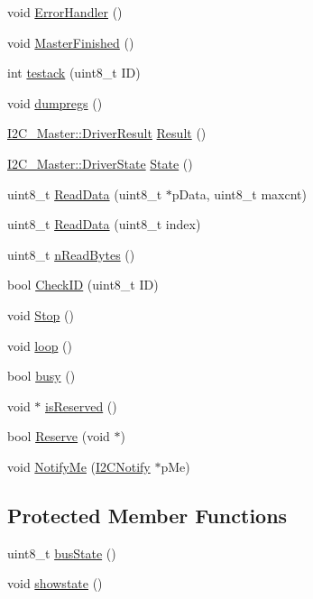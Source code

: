 \begin{DoxyCompactItemize}
\item 
void \hyperlink{class_i2_c___master_a242358ce8f170a38db3624ac55c6510f}{ErrorHandler} ()
\item 
void \hyperlink{class_i2_c___master_aa311bbb226b4c52c52ff87de83d601ee}{MasterFinished} ()
\item 
int \hyperlink{class_i2_c___master_a3dc61a8ad5256ce3aa7219553cbf2f5f}{testack} (uint8\_\-t ID)
\item 
void \hyperlink{class_i2_c___master_a7f45b6d95a4d67b5da5ae81173cf2210}{dumpregs} ()
\item 
\hyperlink{class_i2_c___master_aff65d5186eee9d33563619432439cb53}{I2C\_\-Master::DriverResult} \hyperlink{class_i2_c___master_a24bc6480db778c51e2e1abbacac57a20}{Result} ()
\item 
\hyperlink{class_i2_c___master_aaa6720f57770cfe755cb3d6dfc665cfa}{I2C\_\-Master::DriverState} \hyperlink{class_i2_c___master_a386dc5886d43b456fae8fa0457ad0fa6}{State} ()
\item 
uint8\_\-t \hyperlink{class_i2_c___master_ab7c8dd50c0e931fb20a73e42b2c2202a}{ReadData} (uint8\_\-t $\ast$pData, uint8\_\-t maxcnt)
\item 
uint8\_\-t \hyperlink{class_i2_c___master_a80cb8c3fd55735eea7dbfc90ad7ef5a4}{ReadData} (uint8\_\-t index)
\item 
uint8\_\-t \hyperlink{class_i2_c___master_a62531dd810c1e96ae92657feb6c74bef}{nReadBytes} ()
\item 
bool \hyperlink{class_i2_c___master_a2be70722a626800b0ebeb3cfde946843}{CheckID} (uint8\_\-t ID)
\item 
void \hyperlink{class_i2_c___master_a0e878755be5246de239e897cf60be401}{Stop} ()
\item 
void \hyperlink{class_i2_c___master_af4d34826036a7c9f3ed040d65997f180}{loop} ()
\item 
bool \hyperlink{class_i2_c___master_aa8b792984d9e4f42da45f38dbb6e8941}{busy} ()
\item 
void $\ast$ \hyperlink{class_i2_c___master_ae868b0bca33e7495f4d964ee6708393c}{isReserved} ()
\item 
bool \hyperlink{class_i2_c___master_a0ef6ebd851b05a8dc8e75fa3b349c09b}{Reserve} (void $\ast$)
\item 
void \hyperlink{class_i2_c___master_a608731d8ae2cf3c9141dd4579f74d5f7}{NotifyMe} (\hyperlink{class_i2_c_notify}{I2CNotify} $\ast$pMe)
\end{DoxyCompactItemize}
\subsection*{Protected Member Functions}
\begin{DoxyCompactItemize}
\item 
uint8\_\-t \hyperlink{class_i2_c___master_a386c969250428002f3aeaffeb6933b13}{busState} ()
\item 
void \hyperlink{class_i2_c___master_a50b47d3c18d7aaa0602df3833c6a299e}{showstate} ()
\end{DoxyCompactItemize}


